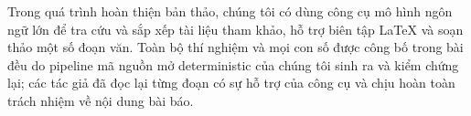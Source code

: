 Trong quá trình hoàn thiện bản thảo, chúng tôi có dùng công cụ mô hình ngôn ngữ lớn
để tra cứu và sắp xếp tài liệu tham khảo, hỗ trợ biên tập \LaTeX{} và soạn thảo một
số đoạn văn. Toàn bộ thí nghiệm và mọi con số được công bố trong bài đều do pipeline
mã nguồn mở deterministic của chúng tôi sinh ra và kiểm chứng lại; các tác giả đã đọc
lại từng đoạn có sự hỗ trợ của công cụ và chịu hoàn toàn trách nhiệm về nội dung bài
báo.

\clearpage
\appendix
\setcounter{table}{0}
\renewcommand{\thetable}{S\arabic{table}}






